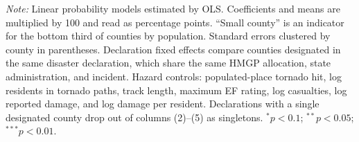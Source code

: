 \begin{table}[!htbp]
\begin{minipage}{0.95\linewidth}
\textit{Note:} Linear probability models estimated by OLS. Coefficients and means are multiplied by 100 and read as percentage points. ``Small county'' is an indicator for the bottom third of counties by population. Standard errors clustered by county in parentheses. Declaration fixed effects compare counties designated in the same disaster declaration, which share the same HMGP allocation, state administration, and incident. Hazard controls: populated-place tornado hit, log residents in tornado paths, track length, maximum EF rating, log casualties, log reported damage, and log damage per resident. Declarations with a single designated county drop out of columns (2)--(5) as singletons. $^{*}p<0.1$; $^{**}p<0.05$; $^{***}p<0.01$.
\end{minipage}
\end{table}
